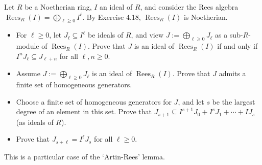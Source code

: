 \documentclass[../../master.tex]{subfiles}
\DeclareMathOperator{\Rees}{Rees}
\begin{document}
\begin{problem}
    Let $R$ be a Noetherian ring, $I$ an ideal of $R$, and consider the Rees algebra $\Rees_R(I) = \bigoplus_{\ell \geq 0} I^{\ell}$.
    By Exercise 4.18, $\Rees_R(I)$ is Noetherian.
    \begin{itemize}
        \item For $\ell \geq 0$, let $J_{\ell} \subseteq I^{\ell}$ be ideals of $R$, and view $J := \bigoplus_{\ell \geq 0} J_{\ell}$ as a sub-$R$-module of $\Rees_R(I)$.
            Prove that $J$ is an ideal of $\Rees_R(I)$ if and only if $I^{n} J_\ell \subseteq J_{\ell + n}$ for all $\ell, n \geq 0$.
        \item Assume $J := \bigoplus_{\ell \geq 0} J_\ell$ is an ideal of $\Rees_R(I)$.
            Prove that $J$ admits a finite set of homogeneous generators.
        \item Choose a finite set of homogeneous generators for $J$, and let $s$ be the largest degree of an element in this set.
            Prove that $J_{s+1} \subseteq I^{s+1}J_0 + I^{s}J_1 + \cdots + IJ_s$ (as ideals of $R$).
        \item Prove that $J_{s+\ell} = I^{\ell}J_s$ for all $\ell \geq 0$.
    \end{itemize}
    This is a particular case of the `Artin-Rees' lemma.
\end{problem}
\end{document}
